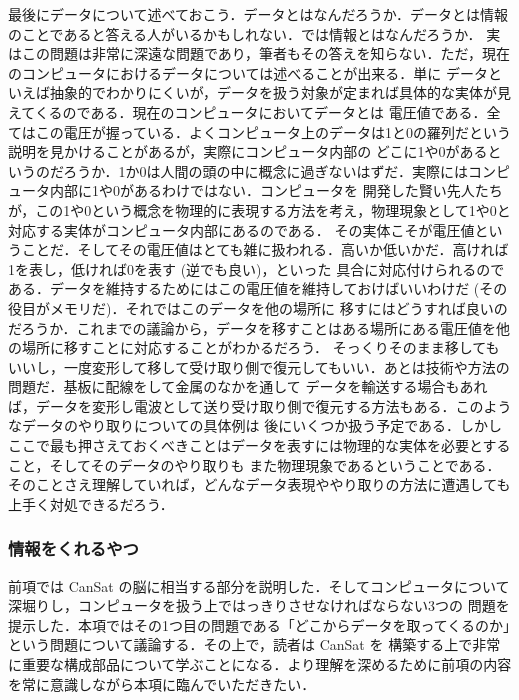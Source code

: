 \documentclass[dvipdfmx]{jsarticle}
\begin{document}
最後にデータについて述べておこう．データとはなんだろうか．データとは情報のことであると答える人がいるかもしれない．では情報とはなんだろうか．
実はこの問題は非常に深遠な問題であり，筆者もその答えを知らない．ただ，現在のコンピュータにおけるデータについては述べることが出来る．単に
データといえば抽象的でわかりにくいが，データを扱う対象が定まれば具体的な実体が見えてくるのである．現在のコンピュータにおいてデータとは
電圧値である．全てはこの電圧が握っている．よくコンピュータ上のデータは1と0の羅列だという説明を見かけることがあるが，実際にコンピュータ内部の
どこに1や0があるというのだろうか．1か0は人間の頭の中に概念に過ぎないはずだ．実際にはコンピュータ内部に1や0があるわけではない．コンピュータを
開発した賢い先人たちが，この1や0という概念を物理的に表現する方法を考え，物理現象として1や0と対応する実体がコンピュータ内部にあるのである．
その実体こそが電圧値ということだ．そしてその電圧値はとても雑に扱われる．高いか低いかだ．高ければ1を表し，低ければ0を表す (逆でも良い)，といった
具合に対応付けられるのである．データを維持するためにはこの電圧値を維持しておけばいいわけだ (その役目がメモリだ)．それではこのデータを他の場所に
移すにはどうすれば良いのだろうか．これまでの議論から，データを移すことはある場所にある電圧値を他の場所に移すことに対応することがわかるだろう．
そっくりそのまま移してもいいし，一度変形して移して受け取り側で復元してもいい．あとは技術や方法の問題だ．基板に配線をして金属のなかを通して
データを輸送する場合もあれば，データを変形し電波として送り受け取り側で復元する方法もある．このようなデータのやり取りについての具体例は
後にいくつか扱う予定である．しかしここで最も押さえておくべきことはデータを表すには物理的な実体を必要とすること，そしてそのデータのやり取りも
また物理現象であるということである．そのことさえ理解していれば，どんなデータ表現ややり取りの方法に遭遇しても上手く対処できるだろう．


\subsubsection{情報をくれるやつ}
\label{subsub:情報をくれるやつ}

前項では CanSat の脳に相当する部分を説明した．そしてコンピュータについて深堀りし，コンピュータを扱う上ではっきりさせなければならない3つの
問題を提示した．本項ではその1つ目の問題である「どこからデータを取ってくるのか」という問題について議論する．その上で，読者は CanSat を
構築する上で非常に重要な構成部品について学ぶことになる．より理解を深めるために前項の内容を常に意識しながら本項に臨んでいただきたい．
\end{document}

